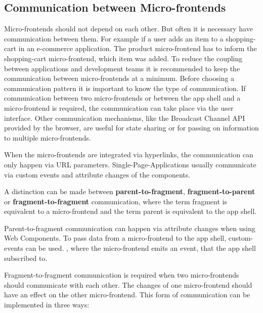 \subsection{Communication between Micro-frontends}

Micro-frontends should not depend on each other. But often it is necessary have communication between them. For example if a user adds an item to a shopping-cart in an e-commerce application. The product micro-frontend has to inform the shopping-cart micro-frontend, which item was added. To reduce the coupling between applications and development teams it is recommended to keep the communication between micro-frontends at a minimum. Before choosing a communication pattern it is important to know the type of communication. If communication between two micro-frontends or between the app shell and a micro-frontend is required, the communication can take place via the user interface. Other communication mechanisms, like the Broadcast Channel API provided by the browser, are useful for state sharing or for passing on information to multiple micro-frontends. \cite{book:2020:geers:background:micro-frontends:micro-frontends-in-action}

When the micro-frontends are integrated via hyperlinks, the communication can only happen via URL parameters. Single-Page-Applications usually communicate via custom events and attribute changes of the components.

A distinction can be made between \textbf{parent-to-fragment}, \textbf{fragment-to-parent} or \textbf{fragment-to-fragment} communication, where the term fragment is equivalent to a micro-frontend and the term parent is equivalent to the app shell. \cite{book:2020:geers:background:micro-frontends:micro-frontends-in-action}


Parent-to-fragment communication can happen via attribute changes when using Web Components. \cite{book:2019:farrell:background:micro-frontends:web-components-in-action} To pass data from a micro-frontend to the app shell, custom-events can be used. \cite{book:2019:farrell:background:micro-frontends:web-components-in-action}, where the micro-frontend emits an event, that the app shell subscribed to. \cite{book:2020:geers:background:micro-frontends:micro-frontends-in-action}

Fragment-to-fragment communication is required when two micro-frontends should communicate with each other. The changes of one micro-frontend should have an effect on the other micro-frontend. This form of communication can be implemented in three ways: \cite{book:2020:geers:background:micro-frontends:micro-frontends-in-action}

